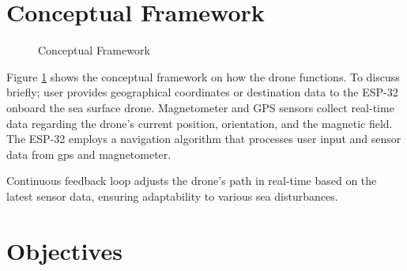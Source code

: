 \section{Conceptual Framework}
\begin{figure}[ht]
\begin{center}
\end{center}

\caption{Conceptual Framework}
\label{fig:ConceptualFramework}
\end{figure}

Figure \ref{fig:ConceptualFramework} shows the conceptual framework on how the drone functions. To discuss briefly; user provides geographical
coordinates or destination data to the ESP-32 onboard the sea surface drone. Magnetometer and GPS sensors collect real-time data regarding the 
drone's current position, orientation, and the magnetic field. The ESP-32 employs a navigation algorithm that processes user input and sensor 
data from gps and magnetometer.

Continuous feedback loop adjusts the drone's path in real-time based on the latest sensor data, ensuring adaptability to various sea disturbances.

\section{Objectives}

